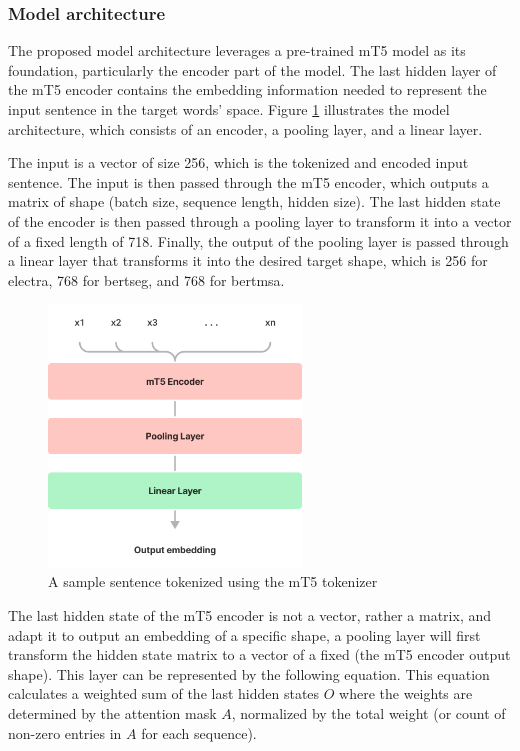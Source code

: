 \documentclass[15pt]{article}
\begin{document}
\subsubsection{Model architecture}

The proposed model architecture leverages a pre-trained mT5 model as its foundation, particularly the encoder part of the model. The last hidden layer of the mT5 encoder contains the embedding information needed to represent the input sentence in the target words’ space. Figure \ref{fig:model-arch} illustrates the model architecture, which consists of an encoder, a pooling layer, and a linear layer.

The input is a vector of size 256, which is the tokenized and encoded input sentence. The input is then passed through the mT5 encoder, which outputs a matrix of shape (batch size, sequence length, hidden size). The last hidden state of the encoder is then passed through a pooling layer to transform it into a vector of a fixed length of 718. Finally, the output of the pooling layer is passed through a linear layer that transforms it into the desired target shape, which is 256 for electra, 768 for bertseg, and 768 for bertmsa.

\begin{figure}[H]
    \centering
    \captionsetup{justification=centering}
    \includegraphics[width=0.6\textwidth]{model-arch.png}
    \caption{A sample sentence tokenized using the mT5 tokenizer}
    \label{fig:model-arch}
\end{figure}

The last hidden state of the mT5 encoder is not a vector, rather a matrix, and adapt it to output an embedding of a specific shape, a pooling layer will first transform the hidden state matrix to a vector of a fixed (the mT5 encoder output shape). This layer can be represented by the following equation. This equation calculates a weighted sum of the last hidden states \(O\) where the weights are determined by the attention mask \(A\), normalized by the total weight (or count of non-zero entries in \(A\) for each sequence).
\end{document}
